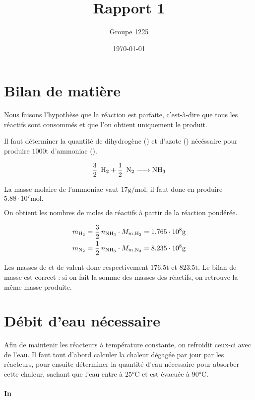 \documentclass[a4paper, oneside, 12pt]{article}
\title{Rapport 1}
\author{Groupe 1225}
\date{\today}
\begin{document}
\maketitle

\section{Bilan de matière}

Nous faisons l'hypothèse que la réaction est parfaite, 
c'est-à-dire que tous les réactifs sont consommés 
et que l'on obtient uniquement le produit.

Il faut déterminer la quantité de dihydrogène () et d'azote () 
nécéssaire pour produire $1000 \si{\tonne}$ d'ammoniac ().

\begin{equation}
	\ce{\frac{3}{2} \, H2 + \frac{1}{2} \, N2 -> NH3} 
	\label{eq:ammoniac}
\end{equation}

La masse molaire de l'ammoniac vaut $17 \si{\gram\per\mole}$,
il faut donc en produire $5.88 \cdot 10^7 \si{\mole}.$

On obtient les nombres de moles de réactifs à partir de la réaction pondérée. 

\begin{align*}
	m_{\ce{H2}}  = \frac{3}{2} \, n_{\ce{NH3}} \cdot M_{m, \ce{H2}} 
	= 1.765 \cdot 10^8  \si{\gram} \\
	m_{\ce{N2}} = \frac{1}{2} \, n_{\ce{NH3}} \cdot M_{m, \ce{N2}} 
	= 8.235 \cdot 10^8 \si{\gram}
\end{align*}

Les masses de  et de  valent donc 
respectivement $176.5 \si{\tonne}$ et $823.5 \si{\tonne}$.
Le bilan de masse est correct : si on fait la somme des masses des réactifs,
on retrouve la même masse produite.


\section{Débit d'eau nécessaire}

Afin de maintenir les réacteurs à température constante, 
on refroidit ceux-ci avec de l'eau.
Il faut tout d'abord calculer la chaleur dégagée par jour par les réacteurs,
pour ensuite déterminer la quantité d'eau nécessaire pour absorber cette chaleur,
sachant que l'eau entre à $25 \si{\degreeCelsius}$ et 
est évacuée à $90 \si{\degreeCelsius}$. 

\paragraph{In}
\end{document}
